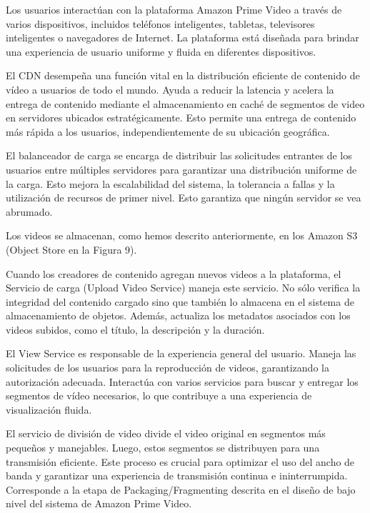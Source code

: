 \documentclass[12pt,a4paper]{article}
\begin{document}
    Los usuarios interactúan con la plataforma Amazon Prime Video a través de varios dispositivos, incluidos teléfonos inteligentes, tabletas, televisores inteligentes o navegadores de Internet. La plataforma está diseñada para brindar una experiencia de usuario uniforme y fluida en diferentes dispositivos.

    El CDN desempeña una función vital en la distribución eficiente de contenido de vídeo a usuarios de todo el mundo. Ayuda a reducir la latencia y acelera la entrega de contenido mediante el almacenamiento en caché de segmentos de video en servidores ubicados estratégicamente. Esto permite una entrega de contenido más rápida a los usuarios, independientemente de su ubicación geográfica.

    El balanceador de carga se encarga de distribuir las solicitudes entrantes de los usuarios entre múltiples servidores para garantizar una distribución uniforme de la carga. Esto mejora la escalabilidad del sistema, la tolerancia a fallas y la utilización de recursos de primer nivel. Esto garantiza que ningún servidor se vea abrumado. \cite{kolny2023}

    Los videos se almacenan, como hemos descrito anteriormente, en los Amazon S3 (Object Store en la Figura 9).

    Cuando los creadores de contenido agregan nuevos videos a la plataforma, el Servicio de carga (Upload Video Service) maneja este servicio. No sólo verifica la integridad del contenido cargado sino que también lo almacena en el sistema de almacenamiento de objetos. Además, actualiza los metadatos asociados con los videos subidos, como el título, la descripción y la duración.

    El View Service es responsable de la experiencia general del usuario. Maneja las solicitudes de los usuarios para la reproducción de videos, garantizando la autorización adecuada. Interactúa con varios servicios para buscar y entregar los segmentos de vídeo necesarios, lo que contribuye a una experiencia de visualización fluida.

    El servicio de división de video divide el video original en segmentos más pequeños y manejables. Luego, estos segmentos se distribuyen para una transmisión eficiente. Este proceso es crucial para optimizar el uso del ancho de banda y garantizar una experiencia de transmisión continua e ininterrumpida. Corresponde a la etapa de Packaging/Fragmenting descrita en el diseño de bajo nivel del sistema de Amazon Prime Video.
\end{document}
